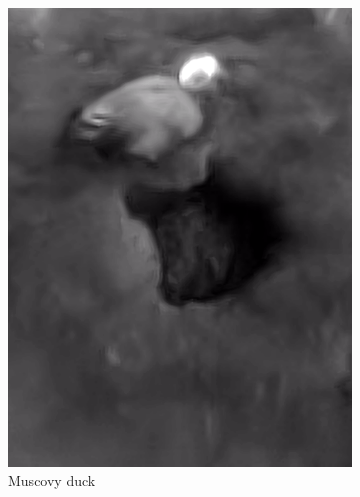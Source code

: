 \documentclass{l4proj}
\begin{document}
\begin{figure}[ht]
\begin{subfigure}[h!]{0.18\textwidth}
    \includegraphics[width=\textwidth, trim={0cm 2.5cm 0cm 2.5cm}, clip]{images/dataset/ugly_duck/lwir.png}
    \caption{Muscovy duck}
  \end{subfigure}
  \begin{subfigure}[h!]{0.18\textwidth}

\end{subfigure}
\end{figure}
\end{document}
